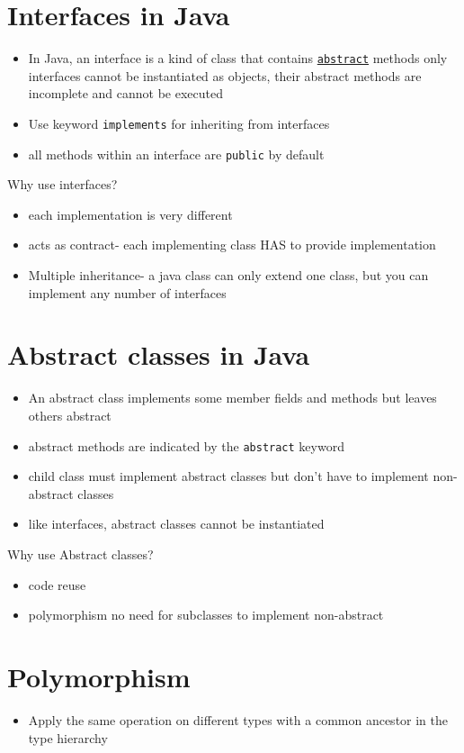\documentclass{article}
\begin{document}
\section{Interfaces in Java}
\begin{itemize}
    \item In Java, an interface is a kind of class that contains \hyperref[itm:abstract]{\texttt{abstract}} methods only
    interfaces cannot be instantiated as objects, their abstract methods are incomplete and cannot be executed 
    \item Use keyword \texttt{implements} for inheriting from interfaces
    \item all methods within an interface are \texttt{public} by default
\end{itemize}
Why use interfaces? 
\begin{itemize}
    \item each implementation is very different
    \item acts as contract- each implementing class HAS to provide implementation
    \item Multiple inheritance- a java class can only extend one class, but you can implement any number of interfaces
\end{itemize}

\section{Abstract classes in Java}
\begin{itemize}
    \item An abstract class implements some member fields and methods but leaves others abstract
    \item abstract methods are indicated  by the \texttt{abstract} keyword
    \item child class must implement abstract classes but don't have to implement non-abstract classes
    \item like interfaces, abstract classes cannot be instantiated
\end{itemize} 
Why use Abstract classes? 
\begin{itemize}
    \item code reuse
    \item polymorphism
    no need for subclasses to implement non-abstract
\end{itemize}


\section{Polymorphism}
\begin{itemize}
    \item Apply the same operation on different types with a common ancestor in the type hierarchy 
    \end{itemize}
\end{document}
